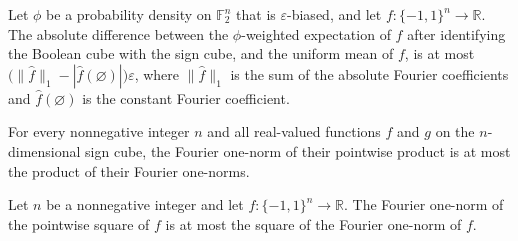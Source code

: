 \begin{theorem}
\label{FABL.ProbabilityDensity.abs_expectation_signFunction_sub_mean_le_fourierOneNorm_sub}
\leanok
{}
Let $\phi$ be a probability density on $\mathbb{F}_2^n$ that is $\varepsilon$-biased,
and let $f:\{-1,1\}^n\to\mathbb{R}$. The absolute difference between the $\phi$-weighted
expectation of $f$ after identifying the Boolean cube with the sign cube, and the
uniform mean of $f$, is at most $\bigl(\|\widehat f\|_1-|\widehat
f(\varnothing)|\bigr)\varepsilon$, where $\|\widehat f\|_1$ is the sum of the absolute
Fourier coefficients and $\widehat f(\varnothing)$ is the constant Fourier coefficient.
\end{theorem}

\begin{theorem}
\label{FABL.fourierOneNorm_pointwise_mul_le}
\leanok
{}
For every nonnegative integer $n$ and all real-valued functions $f$ and $g$ on the
$n$-dimensional sign cube, the Fourier one-norm of their pointwise product is at most
the product of their Fourier one-norms.
\end{theorem}

\begin{theorem}
\label{FABL.fourierOneNorm_sq_le}
\leanok
{}
Let $n$ be a nonnegative integer and let $f:\{-1,1\}^n\to\mathbb R$. The Fourier
one-norm of the pointwise square of $f$ is at most the square of the Fourier one-norm of
$f$.
\end{theorem}

